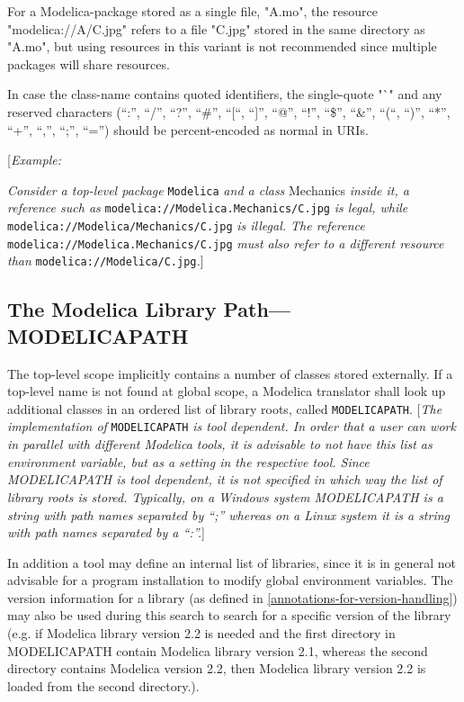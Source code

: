 For a Modelica-package stored as a single file, "A.mo", the resource
"modelica://A/C.jpg" refers to a file "C.jpg" stored in the same
directory as "A.mo", but using resources in this variant is not
recommended since multiple packages will share resources.

In case the class-name contains quoted identifiers, the single-quote "`"
and any reserved characters (``:'', ``/'', ``?'', ``\#'', ``{[}``,
``{]}'', ``@'', ``!'', ``\$'', ``\&'', ``(``, ``)'', ``*'', ``+'',
``,'', ``;'', ``='') should be percent-encoded as normal in URIs.

{[}\emph{Example:}

\emph{Consider a top-level package} \lstinline[basicstyle=\ttfamily]!Modelica! \emph{and a class}
Mechanics \emph{inside it, a reference such as}
\lstinline[basicstyle=\ttfamily]!modelica://Modelica.Mechanics/C.jpg! \emph{is legal, while}
\lstinline[basicstyle=\ttfamily]!modelica://Modelica/Mechanics/C.jpg! \emph{is illegal. The reference}
\lstinline[basicstyle=\ttfamily]!modelica://Modelica.Mechanics/C.jpg! \emph{must also refer to a different
resource than} \lstinline[basicstyle=\ttfamily]!modelica://Modelica/C.jpg!\emph{.}{]}

\subsection{The Modelica Library Path---MODELICAPATH}

The top-level scope implicitly contains a number of classes stored
externally. If a top-level name is not found at global scope, a Modelica
translator shall look up additional classes in an ordered list of
library roots, called \lstinline[basicstyle=\ttfamily]!MODELICAPATH!. {[}\emph{The implementation of}
\lstinline[basicstyle=\ttfamily]!MODELICAPATH! \emph{is tool dependent. In order that a user can work in
parallel with different Modelica tools, it is advisable to not have this
list as environment variable, but as a setting in the respective tool.
Since MODELICAPATH is tool dependent, it is not specified in which way
the list of library roots is stored. Typically, on a Windows system
MODELICAPATH is a string with path names separated by ``;'' whereas on a
Linux system it is a string with path names separated by a ``:''.}{]}

In addition a tool may define an internal list of libraries, since it is
in general not advisable for a program installation to modify global
environment variables. The version information for a library (as defined
in \autoref{annotations-for-version-handling}) may also be used during this search to search for a
specific version of the library (e.g. if Modelica library version 2.2 is
needed and the first directory in MODELICAPATH contain Modelica library
version 2.1, whereas the second directory contains Modelica version 2.2,
then Modelica library version 2.2 is loaded from the second directory.).


